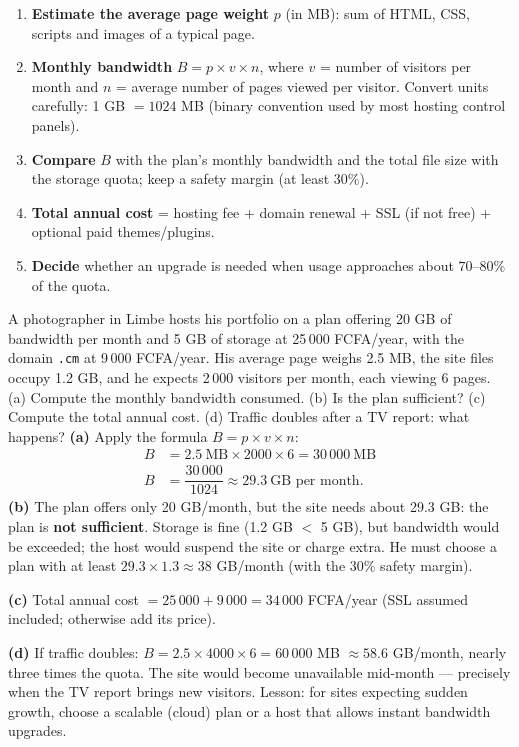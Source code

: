 \documentclass[11pt]{article}
\begin{document}
\begin{methode}
\begin{enumerate}
\item \textbf{Estimate the average page weight} $p$ (in MB): sum of HTML, CSS, scripts and images of a typical page.
\item \textbf{Monthly bandwidth} $B = p \times v \times n$, where $v$ = number of visitors per month and $n$ = average number of pages viewed per visitor. Convert units carefully: 1 GB $= 1024$ MB (binary convention used by most hosting control panels).
\item \textbf{Compare} $B$ with the plan's monthly bandwidth and the total file size with the storage quota; keep a safety margin (at least $30\%$).
\item \textbf{Total annual cost} = hosting fee + domain renewal + SSL (if not free) + optional paid themes/plugins.
\item \textbf{Decide} whether an upgrade is needed when usage approaches about $70$--$80\%$ of the quota.
\end{enumerate}
\end{methode}

\begin{exoresolu}
A photographer in Limbe hosts his portfolio on a plan offering 20 GB of bandwidth per month and 5 GB of storage at 25\,000 FCFA/year, with the domain \texttt{.cm} at 9\,000 FCFA/year. His average page weighs 2.5 MB, the site files occupy 1.2 GB, and he expects 2\,000 visitors per month, each viewing 6 pages. (a) Compute the monthly bandwidth consumed. (b) Is the plan sufficient? (c) Compute the total annual cost. (d) Traffic doubles after a TV report: what happens?
\tcblower
\textbf{(a)} Apply the formula $B = p \times v \times n$:
\begin{align*}
B &= 2.5\ \text{MB} \times 2000 \times 6 = 30\,000\ \text{MB}\\
B &= \dfrac{30\,000}{1024} \approx 29.3\ \text{GB per month}.
\end{align*}
\textbf{(b)} The plan offers only 20 GB/month, but the site needs about 29.3 GB: the plan is \textbf{not sufficient}. Storage is fine (1.2 GB $<$ 5 GB), but bandwidth would be exceeded; the host would suspend the site or charge extra. He must choose a plan with at least $29.3 \times 1.3 \approx 38$ GB/month (with the $30\%$ safety margin).

\textbf{(c)} Total annual cost $= 25\,000 + 9\,000 = 34\,000$ FCFA/year (SSL assumed included; otherwise add its price).

\textbf{(d)} If traffic doubles: $B = 2.5 \times 4000 \times 6 = 60\,000$ MB $\approx 58.6$ GB/month, nearly three times the quota. The site would become unavailable mid-month — precisely when the TV report brings new visitors. Lesson: for sites expecting sudden growth, choose a scalable (cloud) plan or a host that allows instant bandwidth upgrades.
\end{exoresolu}
\end{document}
